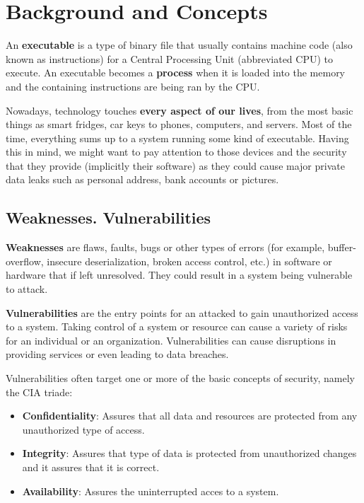 \documentclass[12pt,a4paper,english,onecolumn]{IEEEtran}
\begin{document}
\section{Background and Concepts}

An \textbf{executable} is a type of binary file that usually contains machine code (also known as instructions) for a Central Processing Unit (abbreviated CPU) to execute. An executable becomes a \textbf{process} when it is loaded into the memory and the containing instructions are being ran by the CPU.

Nowadays, technology touches \textbf{every aspect of our lives}, from the most basic things as smart fridges, car keys to phones, computers, and servers. Most of the time, everything sums up to a system running some kind of executable. 
Having this in mind, we might want to pay attention to those devices and the security that they provide (implicitly their software) as they could cause major private data leaks such as personal address, bank accounts or pictures.

\subsection{Weaknesses. Vulnerabilities}

\textbf{Weaknesses} are flaws, faults, bugs or other types of errors (for example, buffer-overflow, insecure deserialization, broken access control, etc.) in software or hardware that if left unresolved. They could result in a system being vulnerable to attack.

\textbf{Vulnerabilities} are the entry points for an attacked to gain unauthorized access to a system. Taking control of a system or resource can cause a variety of risks for an individual or an organization. Vulnerabilities can cause disruptions in providing services or even leading to data breaches.

Vulnerabilities often target one or more of the basic concepts of security, namely the CIA triade:
\begin{itemize}
    \item \textbf{Confidentiality}: Assures that all data and resources are protected from any unauthorized type of access. 
    \item \textbf{Integrity}: Assures that type of data is protected from unauthorized changes and it assures that it is correct.
    \item \textbf{Availability}: Assures the uninterrupted acces to a system.
\end{itemize}
\end{document}
